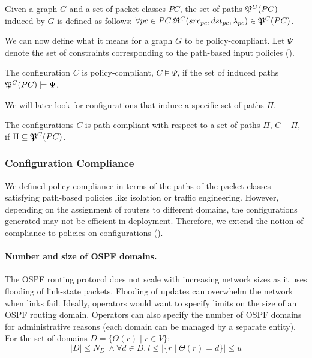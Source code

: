 \begin{definition}
Given a graph $G$ and a set of packet classes $PC$, the set of paths
$\mathfrak{P}^C(PC)$ induced by $G$ is defined as follows: 
$\forall pc \in PC. \mathfrak{R}^C(src_{pc}, dst_{pc}, \lambda_{pc}) \in \mathfrak{P}^C(PC)$.
\end{definition}

\noindent We can now define what it means for a graph $G$ to be policy-compliant. Let 
$\Psi$ denote the set of constraints corresponding to the 
path-based input policies (). 
\begin{definition}
	The configuration $C$ is policy-compliant,
	$C \models \Psi$, if the set of
	induced paths $\mathfrak{P}^C(PC) \models \Psi$.
\end{definition}

We will later look for configurations that induce a specific set of paths $\Pi$.  
\begin{definition}
	The configurations $C$ is path-compliant with respect to 
	a set of paths $\Pi$,
	$C \models \Pi$, if $\Pi\subseteq\mathfrak{P}^C(PC)$.
\end{definition}



\subsubsection{Configuration Compliance}
We defined policy-compliance in terms of the 
paths of the packet classes satisfying path-based 
policies like isolation or traffic engineering. However,
depending on the assignment of routers to different domains,
the configurations generated may not be efficient
in deployment. Therefore, we extend the notion of 
compliance to policies on configurations 
().

\paragraph{Number and size of OSPF domains.} 
The OSPF routing protocol does not scale 
with increasing network sizes
as it uses
flooding of link-state packets. Flooding 
of updates can  
overwhelm the network when links fail. 
Ideally, operators would want to specify
limits on the size of an OSPF routing domain. 
Operators can also specify the number of OSPF domains
for administrative reasons (each domain can be
managed by a separate entity). For the  
set of domains $D = \{\Theta(r) \mid r \in V\}$:
\begin{equation}
	|D| \leq N_{D} ~\wedge \forall d \in D. ~l \leq |\{r \mid \Theta(r) = d\}| \leq u
\end{equation}

